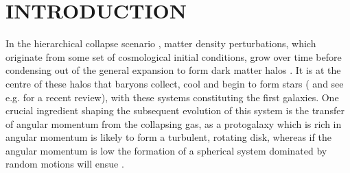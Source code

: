 \documentclass[fleqn,usenatbib]{mn2e}
\begin{document}


\section{INTRODUCTION}

In the hierarchical collapse scenario \citep{Rees1977,Fall1980}, matter density perturbations, which originate from some set of cosmological initial conditions, grow over time before condensing out of the general expansion to form dark matter halos \citep{Silk1968,Peebles1970}.
It is at the centre of these halos that baryons collect, cool and begin to form stars (\citealt{Birnboim2003,Keres2005,Dekel2006} and see e.g. \citealt{Mo2010} for a recent review), with these systems constituting the first galaxies.
One crucial ingredient shaping the subsequent evolution of this system is the transfer of angular momentum from the collapsing gas, as a protogalaxy which is rich in angular momentum is likely to form a turbulent, rotating disk, whereas if the angular momentum is low the formation of a spherical system dominated by random motions will ensue \citep[e.g.][]{Fall1983}. 
\end{document}
